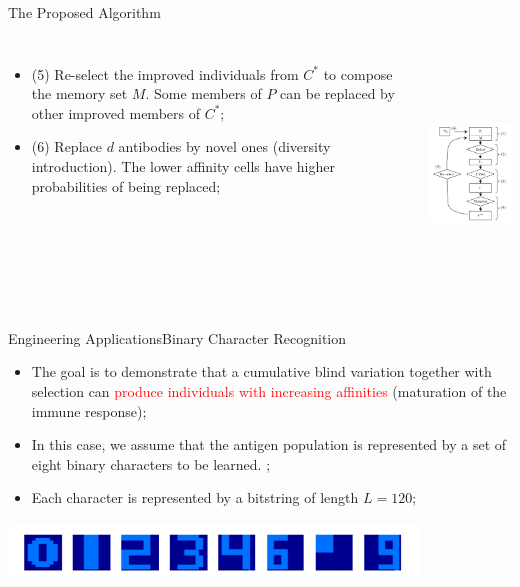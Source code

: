 \begin{frame}{The Proposed Algorithm}
\begin{columns}[c] 
\begin{itemize}
\item{(5) Re-select the improved individuals from \begin{math} C^* \end{math} to compose the memory set \begin{math} M \end{math}. Some members of \begin{math} P \end{math} can be replaced by other improved members of \begin{math} C^* \end{math};}
\item{(6) Replace \begin{math} d \end{math} antibodies by novel ones (diversity introduction). The lower affinity cells have higher probabilities of being replaced;}
\end{itemize}
\includegraphics[height=6.5cm]{img/cj_block_diagram_CSA.png}
\end{columns}
\end{frame}

\begin{frame}{Engineering Applications}{Binary Character Recognition}
\begin{itemize}
\item{The goal is to demonstrate that a cumulative blind variation together with selection can \textcolor{red}{produce individuals with increasing affinities} (maturation of the immune response);}
\item{In this case, we assume that the antigen population is represented by a set of eight binary characters to be learned. ;}
\item{Each character is represented by a bitstring of length \begin{math} L = 120 \end{math};}
\end{itemize}
\includegraphics[height=1.5cm]{img/cj_bitsstring.png}
\end{frame}


